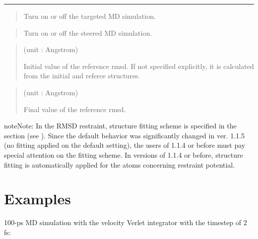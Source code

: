 \documentclass[a4paper,11pt,oneside,english]{sphinxmanual}
\begin{document}
\bigskip\hrule\bigskip


 
\begin{quote}


Turn on or off the targeted MD simulation.
\end{quote}

 
\begin{quote}


Turn on or off the steered MD simulation.
\end{quote}

 
\begin{quote}

 (unit : Angstrom)

Initial value of the reference rmsd.
If not specified explicitly, it is calculated from the initial and referce structures.
\end{quote}

 
\begin{quote}

 (unit : Angstrom)

Final value of the reference rmsd.
\end{quote}

\begin{sphinxadmonition}{note}{Note:}
In the RMSD restraint, structure fitting scheme is specified in the \sphinxstylestrong{{[}FITTING{]}}
section (see {\hyperref[\detokenize{13_Fitting:fitting}]{}}). Since the default behavior was significantly
changed in ver. 1.1.5 (no fitting applied on the default setting),
the users of 1.1.4 or before must pay special attention on the fitting scheme.
In versions of 1.1.4 or before, structure fitting is automatically
applied for the atoms concerning restraint potential.
\end{sphinxadmonition}


\section{Examples}
\label{\detokenize{06_Dynamics:examples}}
100-ps MD simulation with the velocity Verlet integrator with the timestep of 2 fs:
\end{document}

